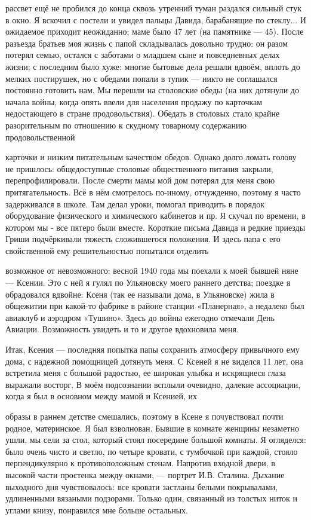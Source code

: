 \label{191-1}
рассвет ещё не пробился до конца сквозь утренний туман 
раздался сильный стук в окно. Я вскочил с постели и увидел пальцы Давида, барабанящие по стеклу... И ожидаемое приходит неожиданно; маме было 47 лет (на памятнике — 45). 
После разъезда братьев моя жизнь с папой складывалась довольно трудно: он разом потерял семью, остался с заботами о младшем сыне и повседневных делах жизни; с последним было хуже: многие бытовые дела решали вдвоём, вплоть до мелких постирушек, но с обедами попали в тупик — никто не соглашался постоянно готовить нам. Мы перешли на столовские обеды (на них дотянули до начала войны, когда опять ввели для населения продажу по карточкам недостающего в стране продовольствия). Обедать в столовых стало крайне разорительным по отношению к скудному товарному содержанию продовольственной

\label{192-1}
карточки и низким питательным качеством обедов. Однако долго ломать голову не пришлось: общедоступные столовые общественного питания закрыли, перепрофилировали. После смерти мамы мой дом потерял для меня свою притягательность. Всё в нём смотрелось по-иному, отчужденно, поэтому я часто задерживался в школе. Там делал уроки, помогал приводить в порядок оборудование физического и химического кабинетов и пр. Я скучал по времени, в котором мы - все пятеро были вместе. Короткие письма Давида и редкие приезды Гриши подчёркивали тяжесть сложившегося положения. И здесь папа с его свойственной ему решительностью попытался отделить

\label{193-1}
возможное от невозможного: весной 1940 года мы поехали к моей бывшей няне — Ксении. Это с ней я гулял по Ульяновску моего раннего детства; поездке я обрадовался вдвойне: Ксеня (так ее называли дома, в Ульяновске) жила в общежитии при какой-то фабрике в районе станции «Планерная», а недалеко был авиаклуб и аэродром «Тушино». Здесь до войны ежегодно отмечали День Авиации. Возможность увидеть и то и другое вдохновила меня.

Итак, Ксения — последняя попытка папы сохранить атмосферу привычного ему дома, с надежной помощницей дотянуть меня. С Ксеней я не виделся 11 лет, она встретила меня с большой радостью, ее широкая улыбка и искрящиеся глаза выражали восторг. В моём подсознании всплыли очевидно, далекие ассоциации, когда я был в основном между мамой и Ксенией, их

\label{194-1}
образы в раннем детстве смешались, поэтому в Ксене я почувствовал почти родное, материнское. Я был взволнован. Бывшие в комнате женщины незаметно ушли, мы сели за стол, который стоял посередине большой комнаты. Я огляделся: было очень чисто и светло, по четыре кровати, с тумбочкой при каждой, стояло перпендикулярно к противоположным стенам. Напротив входной двери, в высокой части простенка между окнами, — портрет И.В. Сталина. Дыхание выходного дня чувствовалось: все кровати застланы белыми покрывалами, удлиненными вязаными подзорами. Только один, связанный из толстых ниток и углами книзу, понравился мне больше остальных.

